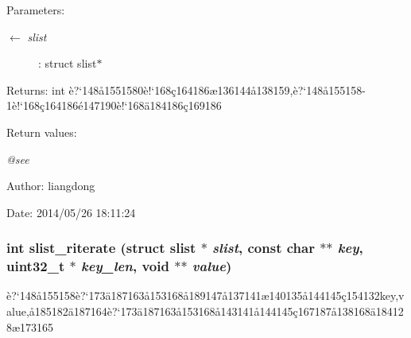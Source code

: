 \begin{Desc}
\item[Parameters:]
\begin{description}
\item[\mbox{$\leftarrow$} {\em slist}]: struct slist$\ast$ \end{description}
\end{Desc}
\begin{Desc}
\item[Returns:]int \`{e}?`148\aa{}1551580\`{e}!`168\c{c}164186\ae{}136144\aa{}138159,\`{e}?`148\aa{}155158-1\`{e}!`168\c{c}164186\'{e}147190\`{e}!`168\"{a}184186\c{c}169186 \end{Desc}
\begin{Desc}
\item[Return values:]
\begin{description}
\item[{\em @see}]\end{description}
\end{Desc}
\begin{Desc}
\item[Author:]liangdong \end{Desc}
\begin{Desc}
\item[Date:]2014/05/26 18:11:24 \end{Desc}
\subsubsection{\setlength{\rightskip}{0pt plus 5cm}int slist\_\-riterate (struct slist $\ast$ {\em slist}, const char $\ast$$\ast$ {\em key}, uint32\_\-t $\ast$ {\em key\_\-len}, void $\ast$$\ast$ {\em value})}\label{slist_8c_a21}


\`{e}?`148\aa{}155158\`{e}?`173\"{a}187163\aa{}153168\aa{}189147\aa{}137141\ae{}140135\aa{}144145\c{c}154132key,value,\aa{}185182\"{a}187164\`{e}?`173\"{a}187163\aa{}153168\aa{}143141\aa{}144145\c{c}167187\aa{}138168\"{a}184128\ae{}173165 

